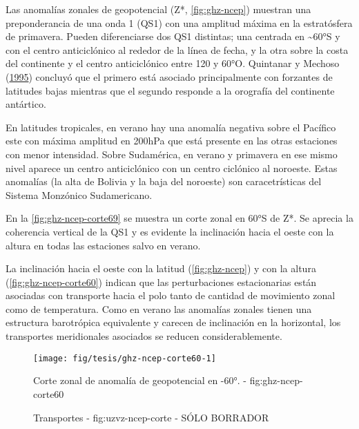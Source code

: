 \documentclass[spanish,a4paper]{book}
\begin{document}
Las anomalías zonales de geopotencial (Z*, \autoref{fig:ghz-ncep})
muestran una preponderancia de una onda 1 (QS1) con una amplitud máxima
en la estratósfera de primavera. Pueden diferenciarse dos QS1 distintas;
una centrada en \textasciitilde{}60°S y con el centro anticiclónico al
rededor de la línea de fecha, y la otra sobre la costa del continente y
el centro anticiclónico entre 120 y 60°O. Quintanar y Mechoso
(\protect\hyperlink{ref-Quintanar1995}{1995}) concluyó que el primero
está asociado principalmente con forzantes de latitudes bajas mientras
que el segundo responde a la orografía del continente antártico.

En latitudes tropicales, en verano hay una anomalía negativa sobre el
Pacífico este con máxima amplitud en 200hPa que está presente en las
otras estaciones con menor intensidad. Sobre Sudamérica, en verano y
primavera en ese mismo nivel aparece un centro anticiclónico con un
centro ciclónico al noroeste. Estas anomalías (la alta de Bolivia y la
baja del noroeste) son caracetrísticas del Sistema Monzónico
Sudamericano.

En la \autoref{fig:ghz-ncep-corte69} se muestra un corte zonal en 60°S
de Z*. Se aprecia la coherencia vertical de la QS1 y es evidente la
inclinación hacia el oeste con la altura en todas las estaciones salvo
en verano.

La inclinación hacia el oeste con la latitud (\autoref{fig:ghz-ncep}) y
con la altura (\autoref{fig:ghz-ncep-corte60}) indican que las
perturbaciones estacionarias están asociadas con transporte hacia el
polo tanto de cantidad de movimiento zonal como de temperatura. Como en
verano las anomalías zonales tienen una estructura barotrópica
equivalente y carecen de inclinación en la horizontal, los transportes
meridionales asociados se reducen considerablemente. 

\begin{figure}

{\centering \texttt{[image: fig/tesis/ghz-ncep-corte60-1]} 

}

\caption{Corte zonal de anomalía de geopotencial en -60°. - fig:ghz-ncep-corte60}\label{fig:ghz-ncep-corte60}
\end{figure}

\begin{figure*}
\newline{}\caption{Transportes - fig:uzvz-ncep-corte - SÓLO BORRADOR}\label{fig:uzvz-ncep-corte}
\end{figure*}
\end{document}
